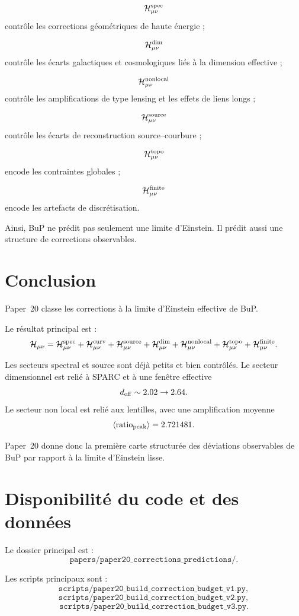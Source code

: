 \documentclass[11pt,a4paper]{article}
\begin{document}
\[
\mathcal{H}_{\mu\nu}^{\rm spec}
\]
contrôle les corrections géométriques de haute énergie ;

\[
\mathcal{H}_{\mu\nu}^{\rm dim}
\]
contrôle les écarts galactiques et cosmologiques liés à la dimension
effective ;

\[
\mathcal{H}_{\mu\nu}^{\rm nonlocal}
\]
contrôle les amplifications de type lensing et les effets de liens longs ;

\[
\mathcal{H}_{\mu\nu}^{\rm source}
\]
contrôle les écarts de reconstruction source--courbure ;

\[
\mathcal{H}_{\mu\nu}^{\rm topo}
\]
encode les contraintes globales ;

\[
\mathcal{H}_{\mu\nu}^{\rm finite}
\]
encode les artefacts de discrétisation.

Ainsi, BuP ne prédit pas seulement une limite d'Einstein. Il prédit aussi une
structure de corrections observables.

\section{Conclusion}

Paper~20 classe les corrections à la limite d'Einstein effective de BuP.

Le résultat principal est :
\[
\mathcal{H}_{\mu\nu}
=
\mathcal{H}^{\rm spec}_{\mu\nu}
+
\mathcal{H}^{\rm curv}_{\mu\nu}
+
\mathcal{H}^{\rm source}_{\mu\nu}
+
\mathcal{H}^{\rm dim}_{\mu\nu}
+
\mathcal{H}^{\rm nonlocal}_{\mu\nu}
+
\mathcal{H}^{\rm topo}_{\mu\nu}
+
\mathcal{H}^{\rm finite}_{\mu\nu}.
\]

Les secteurs spectral et source sont déjà petits et bien contrôlés. Le secteur
dimensionnel est relié à SPARC et à une fenêtre effective
\[
d_{\rm eff}\sim2.02\to2.64.
\]
Le secteur non local est relié aux lentilles, avec une amplification moyenne
\[
\langle{\rm ratio}_{\rm peak}\rangle=2.721481.
\]

Paper~20 donne donc la première carte structurée des déviations observables de
BuP par rapport à la limite d'Einstein lisse.

\section*{Disponibilité du code et des données}

Le dossier principal est :
\[
\texttt{papers/paper20\_corrections\_predictions/}.
\]

Les scripts principaux sont :
\[
\texttt{scripts/paper20\_build\_correction\_budget\_v1.py},
\]
\[
\texttt{scripts/paper20\_build\_correction\_budget\_v2.py},
\]
\[
\texttt{scripts/paper20\_build\_correction\_budget\_v3.py}.
\]
\end{document}
